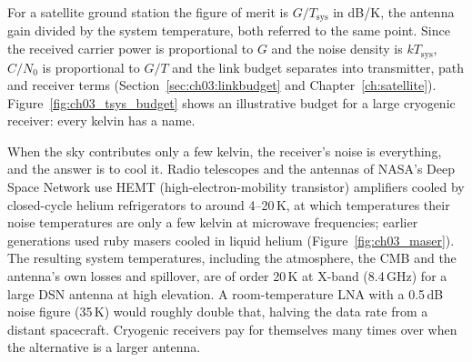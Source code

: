 For a satellite ground station the figure of merit is $G/T_{\text{sys}}$ in dB/K, the antenna gain divided
by the system temperature, both referred to the same point. Since the received carrier power is
proportional to $G$ and the noise density is $kT_{\text{sys}}$, $C/N_0$ is proportional to $G/T$ and the link
budget separates into transmitter, path and receiver terms (Section~\ref{sec:ch03:linkbudget} and
Chapter~\ref{ch:satellite}). Figure~\ref{fig:ch03_tsys_budget} shows an illustrative budget for a large
cryogenic receiver: every kelvin has a name.



\begin{inpractice}
When the sky contributes only a few kelvin, the receiver's noise is everything, and the answer is to cool
it. Radio telescopes and the antennas of NASA's Deep Space Network use HEMT (high-electron-mobility
transistor) amplifiers cooled by closed-cycle helium refrigerators to around 4--20\,K, at which temperatures
their noise temperatures are only a few kelvin at microwave frequencies; earlier generations used ruby masers
cooled in liquid helium (Figure~\ref{fig:ch03_maser}). The resulting system temperatures, including the
atmosphere, the CMB and the antenna's own losses and spillover, are of order 20\,K at X-band (8.4\,GHz) for a
large DSN antenna at high elevation. A room-temperature LNA with a 0.5\,dB noise figure (35\,K) would roughly
double that, halving the data rate from a distant spacecraft. Cryogenic receivers pay for themselves many
times over when the alternative is a larger antenna.
\end{inpractice}

